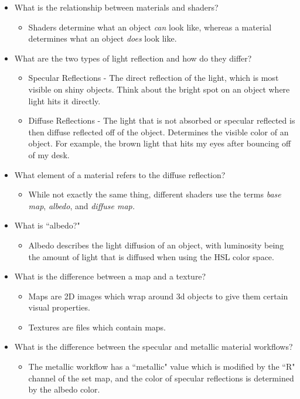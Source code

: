 \documentclass{article}
\begin{document}
\begin{itemize}
    \item What is the relationship between materials and shaders?
    \begin{itemize}
        \item Shaders determine what an object \textit{can} look like, whereas a material determines what an object \textit{does} look like.
    \end{itemize}
    \item What are the two types of light reflection and how do they differ?
    \begin{itemize}
        \item Specular Reflections - The direct reflection of the light, which is most visible on shiny objects. Think about the bright spot on an object where light hits it directly.
        \item Diffuse Reflections - The light that is not absorbed or specular reflected is then diffuse reflected off of the object. Determines the visible color of an object. For example, the brown light that hits my eyes after bouncing off of my desk.
    \end{itemize}
    \item What element of a material refers to the diffuse reflection?
    \begin{itemize}
        \item While not exactly the same thing, different shaders use the terms \textit{base map}, \textit{albedo}, and \textit{diffuse map.}
    \end{itemize}
    \item What is ``albedo?"
    \begin{itemize}
        \item Albedo describes the light diffusion of an object, with luminosity being the amount of light that is diffused when using the HSL color space.
    \end{itemize}
    \item What is the difference between a map and a texture?
    \begin{itemize}
        \item Maps are 2D images which wrap around 3d objects to give them certain visual properties.
        \item Textures are files which contain maps.
    \end{itemize}
    \item What is the difference between the specular and metallic material workflows?
    \begin{itemize}
        \item The metallic workflow has a ``metallic" value which is modified by the ``R" channel of the set map, and the color of specular reflections is determined by the albedo color.

\end{itemize}
\end{itemize}
\end{document}
